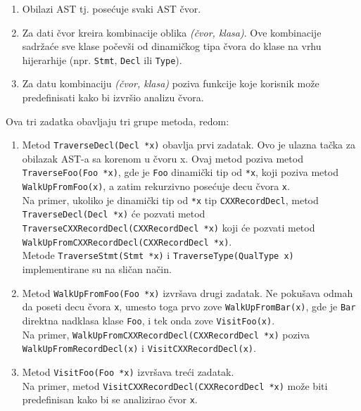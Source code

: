 \documentclass[12pt,oneside]{memoir}
\begin{document}
\begin{enumerate}
\item Obilazi AST tj. posećuje svaki AST čvor.
\item Za dati čvor kreira kombinacije oblika \textit{(\v{c}vor, klasa)}. Ove kombinacije sadr\v{z}a\'{c}e sve klase počevši od dinamičkog tipa čvora do klase na vrhu hijerarhije (npr. \texttt{Stmt}, \texttt{Decl} ili \texttt{Type}).
\item Za datu kombinaciju \textit{(čvor, klasa)} poziva funkcije koje korisnik može predefinisati kako bi izvr\v{s}io analizu čvora.
\end{enumerate}
Ova tri zadatka obavljaju tri grupe metoda, redom:
\begin{enumerate}
  \item Metod \lstinline[style=customc]{TraverseDecl(Decl *x)} obavlja prvi zadatak. Ovo je ulazna tačka za obilazak AST-a sa korenom u čvoru x. Ovaj metod poziva metod \\ \lstinline[style=customc]{TraverseFoo(Foo *x)}, gde je \texttt{Foo} dinamički tip od \texttt{*x}, koji poziva metod \\ \lstinline[style=customc]{WalkUpFromFoo(x)}, a zatim rekurzivno posećuje decu čvora \texttt{x}. \\
  Na primer, ukoliko je dinami\v{c}ki tip od \texttt{*x} tip \texttt{CXXRecordDecl}, metod \\ \lstinline[style=customc]{TraverseDecl(Decl *x)} \'{c}e pozvati metod \\ \lstinline[style=customc]{TraverseCXXRecordDecl(CXXRecordDecl *x)} koji \'{c}e pozvati metod \\ \lstinline[style=customc]{WalkUpFromCXXRecordDecl(CXXRecordDecl *x)}. \\ Metode \lstinline[style=customc]{TraverseStmt(Stmt *x)} i \lstinline[style=customc]{TraverseType(QualType x)} implementirane su na sličan način.
 
\item Metod \lstinline[style=customc]{WalkUpFromFoo(Foo *x)} izvršava drugi zadatak. Ne pokušava odmah da poseti decu čvora \texttt{x}, umesto toga prvo zove \lstinline[style=customc]{WalkUpFromBar(x)}, gde je \texttt{Bar} direktna nadklasa klase \texttt{Foo}, i tek onda zove \lstinline[style=customc]{VisitFoo(x)}. \\
Na primer, \lstinline[style=customc]{WalkUpFromCXXRecordDecl(CXXRecordDecl *x)} poziva \\ \lstinline[style=customc]{WalkUpFromRecordDecl(x)} i \lstinline[style=customc]{VisitCXXRecordDecl(x)}.
\item Metod \lstinline[style=customc]{VisitFoo(Foo *x)} izvršava tre\'{c}i zadatak. \\Na primer, metod \lstinline[style=customc]{VisitCXXRecordDecl(CXXRecordDecl *x)} mo\v{z}e biti predefinisan kako bi se analizirao \v{c}vor \texttt{x}.
\end{enumerate}
\end{document}
